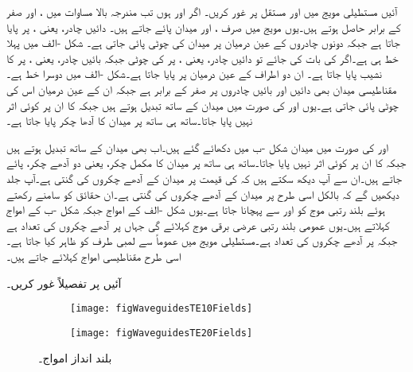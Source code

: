 آئیں مستطیلی مویج میں   اور  مستقل پر غور کریں۔ اگر  اور  ہوں تب مندرجہ بالا مساوات میں ،  اور  صفر کے برابر حاصل ہوتے ہیں۔یوں مویج میں صرف ،  اور  میدان پائے جاتے ہیں۔ دائیں چادر، یعنی ، پر  پایا جاتا ہے جبکہ دونوں چادروں کے عین درمیان  پر میدان کی چوٹی پائی جاتی ہے۔ شکل -الف میں پہلا خط  ہی ہے۔اگر  کی بات کی جائے تو دائیں چادر، یعنی ، پر  کی چوٹی جبکہ بائیں چادر، یعنی ، پر  کا نشیب پایا جاتا ہے۔ ان دو اطراف کے عین درمیان  پر  پایا جاتا ہے۔شکل -الف میں دوسرا خط  ہے۔مقناطیسی میدان  بھی دائیں اور بائیں چادروں پر صفر کے برابر ہے جبکہ ان کے عین درمیان اس کی چوٹی پائی جاتی ہے۔یوں  اور  کی صورت میں میدان  کے ساتھ تبدیل ہوتے ہیں جبکہ  کا ان پر کوئی اثر نہیں پایا جاتا۔ساتھ ہی ساتھ  پر میدان کا آدھا چکر پایا جاتا ہے۔ 

 اور  کی صورت میں میدان شکل -ب  میں دکھائے گئے ہیں۔اب بھی میدان  کے ساتھ تبدیل ہوتے ہیں جبکہ  کا ان پر کوئی اثر نہیں پایا جاتا۔ساتھ ہی ساتھ  پر میدان کا مکمل چکر، یعنی دو آدھے چکر، پائے جاتے ہیں۔ان سے آپ دیکھ سکتے ہیں کہ  کی قیمت  پر میدان کے آدھے چکروں کی گنتی ہے۔آپ جلد دیکھیں گے کہ  بالکل اسی طرح  پر میدان کے آدھے چکروں کی گنتی ہے۔ان حقائق کو سامنے رکھتے ہوئے بلند رتبی  موج کو  اور  سے پہچانا جاتا ہے۔یوں شکل -الف کے امواج   جبکہ شکل -ب کے امواج  کہلاتے ہیں۔یوں عمومی بلند رتبی عرضی برقی موج  کہلائے گی جہاں  پر آدھے چکروں کی تعداد  ہے جبکہ  پر آدھے چکروں کی تعداد  ہے۔مستطیلی مویج میں عموماً  سے لمبی طرف کو ظاہر کیا جاتا ہے۔اسی طرح مقناطیسی امواج  کہلائے جاتے ہیں۔

آئیں  پر تفصیلاً غور کریں۔


\begin{figure}
\centering
\begin{subfigure}{0.5\textwidth}
\centering
\texttt{[image: figWaveguidesTE10Fields]}
\end{subfigure}%
%
\begin{subfigure}{0.5\textwidth}
\centering
\texttt{[image: figWaveguidesTE20Fields]}
\end{subfigure}%
\caption{بلند  انداز  امواج۔}
\label{شکل_مویج_بلند_ایک_صفر_دو_صفر}
\end{figure}

